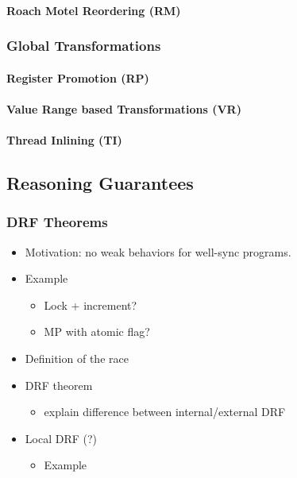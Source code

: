 \paragraph{Roach Motel Reordering (RM)}

\subsubsection{Global Transformations}

\paragraph{Register Promotion (RP)}

\paragraph{Value Range based Transformations (VR)}

\paragraph{Thread Inlining (TI)}

\subsection{Reasoning Guarantees}

\subsubsection{DRF Theorems}
\label{sec:bgrnd-drf}

\begin{itemize}
  \item Motivation: no weak behaviors for well-sync programs.
  \item Example
  \begin{itemize}
    \item Lock + increment?
    \item MP with atomic flag?
  \end{itemize}
  \item Definition of the race
  \item DRF theorem
  \begin{itemize}
    \item explain difference between internal/external DRF
  \end{itemize}
  \item Local DRF (?)
  \begin{itemize}
    \item Example
  \end{itemize}
\end{itemize}


